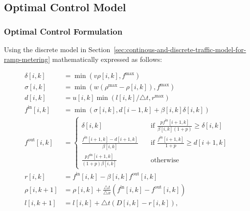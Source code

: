 \subsection{Optimal Control Model}
\label{sub:fhoc-adjoint}

\subsubsection{Optimal Control Formulation}

Using the discrete model in Section~\ref{sec:continous-and-discrete-traffic-model-for-ramp-metering} mathematically expressed as follows:

\begin{align}
    \delta\left[i,k\right] & = \min\left(v \rho\left[i,k\right], f^{\max} \right) \\
    \sigma\left[i,k\right] & = \min\left(w\left(\rho^{\max} - \rho\left[i,k\right]\right), f^{\max}\right) \\
    d\left[i,k\right] & = u\left[i,k\right]\min \left(l\left[i,k\right] / \triangle t, r^{\max}\right) \\
    f^{\text{in}}\left[i,k\right] & = \min\left(\sigma\left[i,k\right], d\left[i-1,k\right] + \beta\left[i,k\right] \delta\left[i,k\right]\right) \\
    f^{\text{out}}\left[i,k\right] & = 
    \begin{cases}
    \delta\left[i,k\right] & \quad \mbox{if } \frac{p f^{\text{in}}\left[i+1,k\right] }{\beta\left[i,k\right] \left(1 + p\right)} \ge \delta\left[i,k\right] \\
    \frac{f^{\text{in}}\left[i+1,k\right] - d\left[i+1,k\right]}{\beta\left[i,k\right]} & \quad \mbox{if } \frac{f^{\text{in}}[i+1,k]}{1 + p} \ge d\left[i+1,k\right] \\
    \frac{p f^{\text{in}}\left[i+1,k\right]}{\left(1 + p\right) \beta\left[i,k\right]} & \quad \mbox{otherwise}
    \end{cases} \\
    r\left[i,k\right] & = f^{\text{in}}\left[i,k\right] - \beta\left[i,k\right] f^{\text{out}}\left[i,k\right] \\
    \rho\left[i,k+1\right] & = \rho\left[i,k\right] + \frac{\triangle t}{\triangle x} \left(f^{\text{in}}\left[i,k\right] - f^{\text{out}}\left[i,k\right]\right)\\
    l\left[i,k+1\right] & = l\left[i,k\right] + \triangle t \left(D\left[i,k\right] - r\left[i,k\right]\right),
\end{align}

